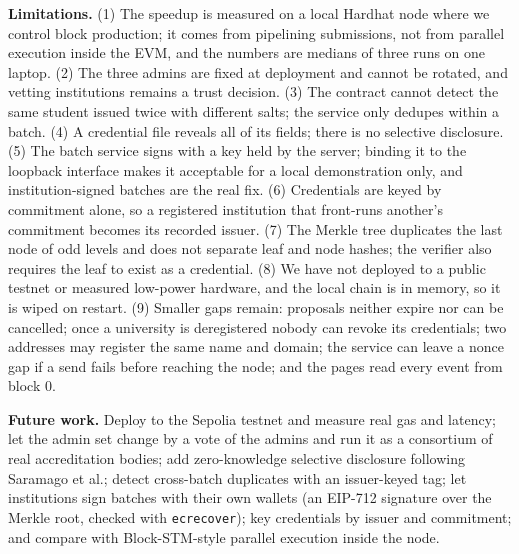 \documentclass[10pt,twocolumn]{article}
\begin{document}
\textbf{Limitations.} (1) The speedup is measured on a local Hardhat node where we control block production; it comes from pipelining submissions, not from parallel execution inside the EVM, and the numbers are medians of three runs on one laptop. (2) The three admins are fixed at deployment and cannot be rotated, and vetting institutions remains a trust decision. (3) The contract cannot detect the same student issued twice with different salts; the service only dedupes within a batch. (4) A credential file reveals all of its fields; there is no selective disclosure. (5) The batch service signs with a key held by the server; binding it to the loopback interface makes it acceptable for a local demonstration only, and institution-signed batches are the real fix. (6) Credentials are keyed by commitment alone, so a registered institution that front-runs another's commitment becomes its recorded issuer. (7) The Merkle tree duplicates the last node of odd levels and does not separate leaf and node hashes; the verifier also requires the leaf to exist as a credential. (8) We have not deployed to a public testnet or measured low-power hardware, and the local chain is in memory, so it is wiped on restart. (9) Smaller gaps remain: proposals neither expire nor can be cancelled; once a university is deregistered nobody can revoke its credentials; two addresses may register the same name and domain; the service can leave a nonce gap if a send fails before reaching the node; and the pages read every event from block 0.

\textbf{Future work.} Deploy to the Sepolia testnet and measure real gas and latency; let the admin set change by a vote of the admins and run it as a consortium of real accreditation bodies; add zero-knowledge selective disclosure following Saramago et al.; detect cross-batch duplicates with an issuer-keyed tag; let institutions sign batches with their own wallets (an EIP-712 signature over the Merkle root, checked with \texttt{ecrecover}); key credentials by issuer and commitment; and compare with Block-STM-style parallel execution inside the node.
\end{document}
